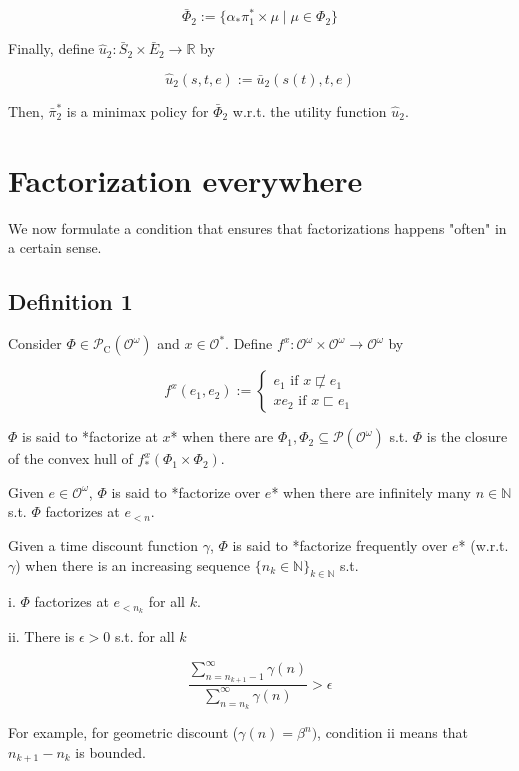 \documentclass[a4paper]{article}
\newcommand{\Nats}{\mathbb{N}}
\newcommand{\Reals}{\mathbb{R}}
\newcommand{\Prob}{\mathcal{P}}
\newcommand{\Obs}{\mathcal{O}}
\newcommand{\ObsO}{\Obs^\omega}
\newcommand{\CC}{\mathcal{P}_{\operatorname{C}}}
\begin{document}
$$\bar{\Phi}_2:=\{\alpha_* \pi_1^* \times \mu \mid \mu \in \Phi_2\}$$

Finally, define ${\hat{u}_2: \bar{S}_2 \times \bar{E}_2 \rightarrow \Reals}$ by

$$\hat{u}_2(s,t,e):=\bar{u}_2(s(t),t,e)$$

Then, ${\bar{\pi}_2^*}$ is a minimax policy for ${\bar{\Phi}_2}$ w.r.t. the utility function ${\hat{u}_2}$.

\section{Factorization everywhere}

We now formulate a condition that ensures that factorizations happens "often" in a certain sense.

\subsection{Definition 1}

Consider ${\Phi \in \CC(\ObsO)}$ and ${x \in \Obs^*}$. Define ${f^x: \ObsO \times \ObsO \rightarrow \ObsO}$ by

$${f^x(e_1,e_2):=\begin{cases}e_1 \text{ if } x \not\sqsubset e_1 \\xe_2 \text{ if } x \sqsubset e_1\end{cases}}$$

${\Phi}$ is said to *factorize at ${x}$* when there are ${\Phi_1, \Phi_2 \subseteq \Prob(\ObsO)}$ s.t. ${\Phi}$ is the closure of the convex hull of ${f^x_*(\Phi_1 \times \Phi_2)}$.

Given ${e \in \ObsO}$, ${\Phi}$ is said to *factorize over ${e}$* when there are infinitely many ${n \in \Nats}$ s.t. ${\Phi}$ factorizes at ${e_{<n}}$.

Given a time discount function ${\gamma}$, ${\Phi}$ is said to *factorize frequently over ${e}$* (w.r.t. ${\gamma}$) when there is an increasing sequence ${\{n_k \in \Nats\}_{k \in \Nats}}$ s.t.

i. ${\Phi}$ factorizes at ${e_{<n_k}}$ for all ${k}$.

ii. There is ${\epsilon > 0}$ s.t. for all ${k}$

$$\frac{\sum_{n = n_{k+1}-1}^\infty \gamma(n)}{\sum_{n = n_{k}}^\infty \gamma(n)} > \epsilon$$

For example, for geometric discount (${\gamma(n)=\beta^n)}$, condition ii means that ${n_{k+1}-n_k}$  is bounded.
\end{document}
